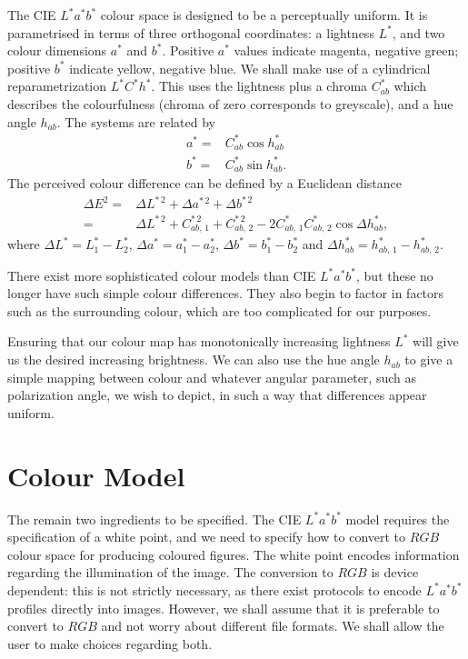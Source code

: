 \documentclass[useAMS,usedcolumn,usegraphicx,usenatbib]{mn2e}
\begin{document}
The CIE $L^\ast a^\ast b^\ast$ colour space is designed to be a perceptually uniform. It is parametrised in terms of three orthogonal coordinates: a lightness $L^\ast$, and two colour dimensions $a^\ast$ and $b^\ast$. Positive $a^\ast$ values indicate magenta, negative green; positive $b^\ast$ indicate yellow, negative blue. We shall make use of a cylindrical reparametrization $L^\ast C^\ast h^\ast$. This uses the lightness plus a chroma $C^\ast_{ab}$ which describes the colourfulness (chroma of zero corresponds to greyscale), and a hue angle $h_{ab}$. The systems are related by
\begin{align}
a^\ast = {} & C^\ast_{ab}\cos h^\ast_{ab} \\
b^\ast = {} & C^\ast_{ab}\sin h^\ast_{ab}.
\end{align}
The perceived colour difference can be defined by a Euclidean distance
\begin{align}
{\Delta E}^2 = {} & \Delta L^{\ast\,2} + \Delta a^{\ast\,2} + \Delta b^{\ast\,2} \\
 = {} &  \Delta L^{\ast\,2} + C^{\ast\,2}_{ab,\,1} + C^{\ast\,2}_{ab,\,2} - 2C^\ast_{ab,\,1}C^\ast_{ab,\,2}\cos \Delta h^\ast_{ab},
\end{align}
where $\Delta L^\ast = L^\ast_1 - L^\ast_2$, $\Delta a^\ast = a^\ast_1 - a^\ast_2$, $\Delta b^\ast = b^\ast_1 - b^\ast_2$ and $\Delta h^\ast_{ab} = h^\ast_{ab,\,1} - h^\ast_{ab,\,2}$.

There exist more sophisticated colour models than CIE $L^\ast a^\ast b^\ast$, but these no longer have such simple colour differences. They also begin to factor in factors such as the surrounding colour, which are too complicated for our purposes.

Ensuring that our colour map has monotonically increasing lightness $L^\ast$ will give us the desired increasing brightness. We can also use the hue angle $h_{ab}$ to give a simple mapping between colour and whatever angular parameter, such as polarization angle, we wish to depict, in such a way that differences appear uniform.

\section{Colour Model}

The remain two ingredients to be specified. The CIE $L^\ast a^\ast b^\ast$ model requires the specification of a white point, and we need to specify how to convert to $RGB$ colour space for producing coloured figures. The white point encodes information regarding the illumination of the image. The conversion to $RGB$ is device dependent: this is not strictly necessary, as there exist protocols to encode $L^\ast a^\ast b^\ast$ profiles directly into images. However, we shall assume that it is preferable to convert to $RGB$ and not worry about different file formats. We shall allow the user to make choices regarding both.
\end{document}
